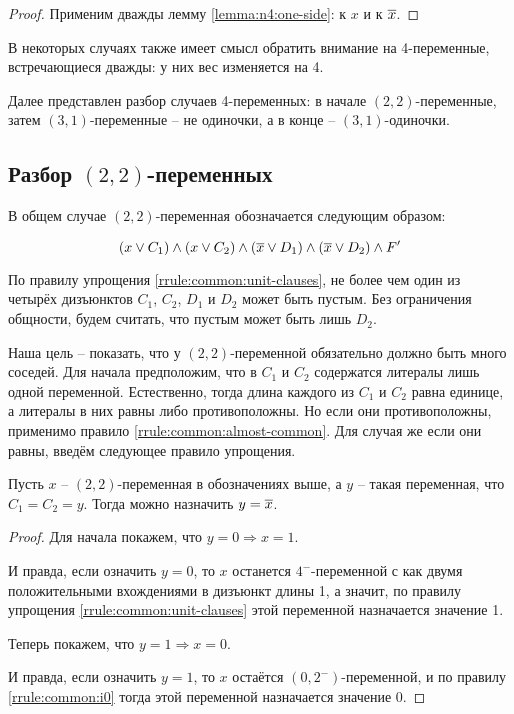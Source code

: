 \begin{proof}
 Применим дважды лемму \ref{lemma:n4:one-side}: к $x$ и к $\overline{x}$.
\end{proof}

В некоторых случаях также имеет смысл обратить внимание на 4-переменные, встречающиеся дважды: у них вес изменяется на 4.

Далее представлен разбор случаев 4-переменных: в начале $(2,2)$-переменные, затем $(3,1)$-переменные -- не одиночки, а в конце -- $(3,1)$-одиночки.

\subsection{Разбор $(2,2)$-переменных}
\label{subsec:n4:22}

\firstpar{}В общем случае $(2,2)$-переменная обозначается следующим образом:

$$
 (x \vee C_1) \wedge (x \vee C_2) \wedge (\overline{x} \vee D_1) \wedge (\overline{x} \vee D_2) \wedge F'
$$

По правилу упрощения \ref{rrule:common:unit-clauses}, не более чем один из четырёх дизъюнктов $C_1$, $C_2$, $D_1$ и $D_2$ может быть пустым. Без ограничения общности, будем считать, что пустым может быть лишь $D_2$.

Наша цель -- показать, что у $(2,2)$-переменной обязательно должно быть много соседей.
Для начала предположим, что в $C_1$ и $C_2$ содержатся литералы лишь одной переменной.
Естественно, тогда длина каждого из $C_1$  и $C_2$ равна единице, а литералы в них равны либо противоположны.
Но если они противоположны, применимо правило \ref{rrule:common:almost-common}.
Для случая же если они равны, введём следующее правило упрощения.

\begin{rrule}
 Пусть $x$ -- $(2,2)$-переменная в обозначениях выше, а $y$ -- такая переменная, что $C_1 = C_2 = y$. Тогда можно назначить $y = \overline{x}$.
\end{rrule}

\begin{proof}
 Для начала покажем, что $y = 0 \Rightarrow x = 1$.

 И правда, если означить $y = 0$, то $x$ останется $4^-$-переменной с как двумя положительными вхождениями в дизъюнкт длины 1, а значит, по правилу упрощения \ref{rrule:common:unit-clauses} этой переменной назначается значение 1.

 Теперь покажем, что $y = 1 \Rightarrow x = 0$.

 И правда, если означить $y = 1$, то $x$ остаётся $(0,2^-)$-переменной, и по правилу \ref{rrule:common:i0} тогда этой переменной назначается значение 0.
\end{proof}

